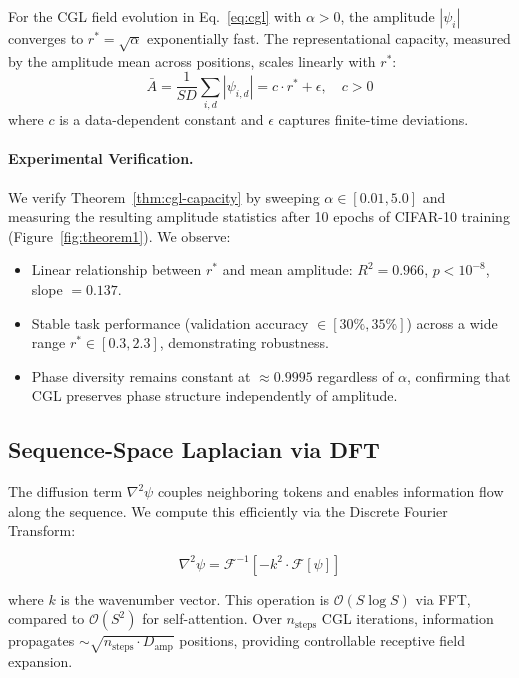 \begin{theorem}
\label{thm:cgl-capacity}
For the CGL field evolution in Eq.~\eqref{eq:cgl} with $\alpha > 0$, the amplitude $|\psi_i|$ converges to $r^* = \sqrt{\alpha}$ exponentially fast. The representational capacity, measured by the amplitude mean across positions, scales linearly with $r^*$:
\begin{equation}
\bar{A} = \frac{1}{SD} \sum_{i,d} |\psi_{i,d}| = c \cdot r^* + \epsilon, \quad c > 0
\end{equation}
where $c$ is a data-dependent constant and $\epsilon$ captures finite-time deviations.
\end{theorem}

\paragraph{Experimental Verification.}
We verify Theorem~\ref{thm:cgl-capacity} by sweeping $\alpha \in [0.01, 5.0]$ and measuring the resulting amplitude statistics after 10 epochs of CIFAR-10 training (Figure~\ref{fig:theorem1}). We observe:
\begin{itemize}
\item Linear relationship between $r^*$ and mean amplitude: $R^2 = 0.966$, $p < 10^{-8}$, slope $= 0.137$.
\item Stable task performance (validation accuracy $\in [30\%, 35\%]$) across a wide range $r^* \in [0.3, 2.3]$, demonstrating robustness.
\item Phase diversity remains constant at $\approx 0.9995$ regardless of $\alpha$, confirming that CGL preserves phase structure independently of amplitude.
\end{itemize}

\subsection{Sequence-Space Laplacian via DFT}

The diffusion term $\nabla^2 \psi$ couples neighboring tokens and enables information flow along the sequence. We compute this efficiently via the Discrete Fourier Transform:

\begin{equation}
\nabla^2 \psi = \mathcal{F}^{-1}\left[ -k^2 \cdot \mathcal{F}[\psi] \right]
\label{eq:laplacian}
\end{equation}

where $k$ is the wavenumber vector. This operation is $\mathcal{O}(S \log S)$ via FFT, compared to $\mathcal{O}(S^2)$ for self-attention. Over $n_{\mathrm{steps}}$ CGL iterations, information propagates $\sim \sqrt{n_{\mathrm{steps}} \cdot D_{\mathrm{amp}}}$ positions, providing controllable receptive field expansion.

